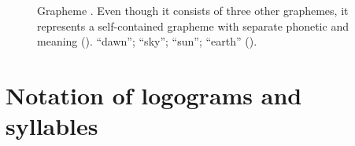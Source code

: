 \documentclass[../main.tex]{subfiles}
\begin{document}
\begin{figure}
{        \label{fig:terminology-glyphs-chan}
    }
    \caption[Grapheme ]{Grapheme . Even though it consists of three 
             other graphemes, it represents a self-contained grapheme with separate phonetic and 
             meaning (\cite[139]{prager2018}).
               ``dawn'';
               ``sky'';
               ``sun'';
               ``earth'' (\authordrawings).}
\end{figure}

\section{Notation of logograms and syllables}
\cite{jamesjusteson1984}
\end{document}
